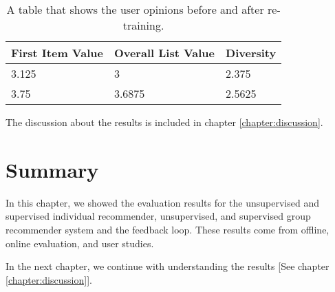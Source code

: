 \begin{table}[htpb]
	\caption[Online Evaluation Table]{A table that shows the user opinions before and after re-training.}\label{tab:online-evaluation}
	\centering
	\begin{tabular}{l l l}
		\toprule
		First Item Value & Overall List Value & Diversity \\
		\midrule
		3.125 & 3 & 2.375\\
		3.75 & 3.6875 & 2.5625 \\
		\bottomrule
	\end{tabular}
\end{table}

The discussion about the results is included in chapter \ref{chapter:discussion}.

\section{Summary}

In this chapter, we showed the evaluation results for the unsupervised and supervised individual recommender, unsupervised, and supervised group recommender system and the feedback loop. These results come from offline, online evaluation, and user studies. 

In the next chapter, we continue with understanding the results [See chapter \ref{chapter:discussion}].

